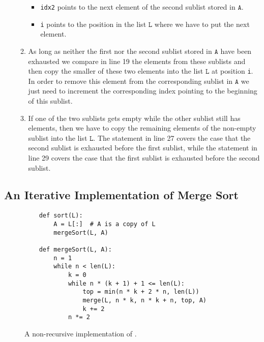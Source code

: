\begin{enumerate}
\begin{enumerate}
\begin{itemize}
            \item \texttt{idx2} points to the next element of the second sublist stored in $\texttt{A}$.
            \item \texttt{i} points to the position in the list $\texttt{L}$ where we have to put the next
                  element.
            \end{itemize}
      \item As long as neither the first nor the second sublist stored in $\texttt{A}$ have been exhausted
            we compare in line 19 the elements from these sublists and then copy the smaller of these
            two elements into the list $\texttt{L}$ at position \texttt{i}.
            In order to remove this element from the corresponding sublist in $\texttt{A}$ we just need to
            increment the corresponding index pointing to the beginning of this sublist.
      \item If one of the two sublists gets empty while the other sublist still has elements, then we have
            to copy the remaining elements of the non-empty sublist into the list $\texttt{L}$.
            The statement in line 27 covers the case that the second sublist is exhausted before 
            the first sublist, while the statement in line 29 covers the case that the first
            sublist is exhausted before the second sublist.
      \end{enumerate}
\end{enumerate}

\subsection{An Iterative Implementation of Merge Sort}

\begin{figure}[!ht]
  \centering
\begin{verbatim}
    def sort(L):
        A = L[:]  # A is a copy of L
        mergeSort(L, A)

    def mergeSort(L, A):
        n = 1
        while n < len(L):
            k = 0
            while n * (k + 1) + 1 <= len(L):
                top = min(n * k + 2 * n, len(L))
                merge(L, n * k, n * k + n, top, A)
                k += 2    
            n *= 2 
\end{verbatim}
\vspace*{-0.3cm}
  \caption{A non-recursive implementation of .}
  \label{fig:merge-sort-nr.stlx}
\end{figure}

